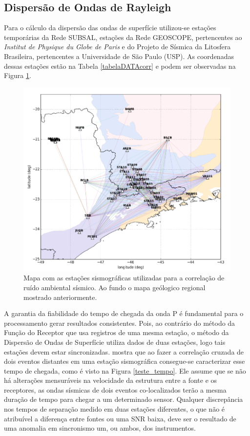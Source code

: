 \subsection{Dispersão de Ondas de Rayleigh}

Para o cálculo da dispersão das ondas de superfície utilizou-se estações temporárias da Rede SUBSAL, estações da Rede GEOSCOPE, pertencentes ao \textit{Institut de Physique du Globe de Paris} e do Projeto de Sísmica  da Litosfera Brasileira, pertencentes a Universidade de São Paulo (USP). As coordenadas dessas estações estão na Tabela \ref{tabelaDATAcorr} e podem ser observadas na Figura \ref{STA_corr}.

\begin{figure}[!ht]
\centering
\includegraphics[scale=0.5]{Figs/sta_corr.png}
\caption{Mapa com as estações sismográficas utilizadas para a correlação de ruído ambiental sísmico. Ao fundo o mapa geólogico regional mostrado anteriormente.}
\label{STA_corr}
\end{figure}


A garantia da fiabilidade do tempo de chegada da onda P é fundamental para o processamento gerar resultados consistentes. Pois, ao contrário do método da Função do Receptor que usa registros de uma mesma estação, o método da Dispersão de Ondas de Superfície utiliza dados de duas estações, logo tais estações devem estar sincronizadas. \cite{gibbons_identification_2006} mostra que ao fazer a correlação cruzada de dois eventos distantes em uma estação sismográfica consegue-se caracterizar esse tempo de chegada, como é visto na Figura \ref{teste_tempo}. Ele assume que se não há alterações mensuráveis na velocidade da estrutura entre a fonte e os receptores, as ondas sísmicas de dois eventos co-localizados terão a mesma duração de tempo para chegar a um determinado sensor. Qualquer discrepância nos tempos de separação medido em duas estações diferentes, o que não é atribuível a diferença entre fontes ou uma SNR baixa, deve ser o resultado de uma anomalia em sincronismo um, ou ambos, dos instrumentos.

